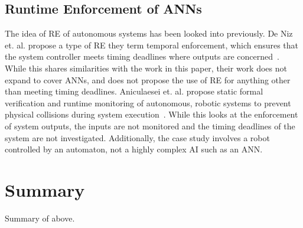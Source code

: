 \subsection{Runtime Enforcement of \acp{ANN}}
The idea of \ac{RE} of autonomous systems has been looked into previously. 
De Niz et. al. propose a type of \ac{RE} they term temporal enforcement, which ensures that the system controller meets timing deadlines where outputs are concerned~\cite{safe-enforce-auto}. 
While this shares similarities with the work in this paper, their work does not expand to cover \acp{ANN}, and does not propose the use of \ac{RE} for anything other than meeting timing deadlines.
Aniculaesei et. al. propose static formal verification and runtime monitoring of autonomous, robotic systems to prevent physical collisions during system execution~\cite{runtime-monitor}.
While this looks at the enforcement of system outputs, the inputs are not monitored and the timing deadlines of the system are not investigated. 
Additionally, the case study involves a robot controlled by an automaton, not a highly complex \ac{AI} such as an \ac{ANN}.





\section{Summary}
Summary of above.


